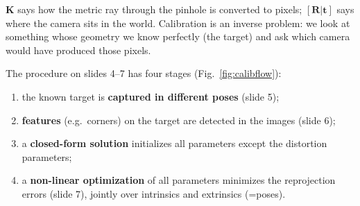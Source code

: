 \documentclass[11pt,a4paper]{article}
\begin{document}
\begin{intuition}
$\bm K$ says how the metric ray through the pinhole is converted to pixels; $[\bm R|\bm t]$ says where the
camera sits in the world. Calibration is an inverse problem: we look at something whose geometry we
know perfectly (the target) and ask which camera would have produced those pixels.
\end{intuition}

The procedure on slides 4--7 has four stages (Fig.~\ref{fig:calibflow}):
\begin{enumerate}
\item the known target is \textbf{captured in different poses} (slide 5);
\item \textbf{features} (e.g.\ corners) on the target are detected in the images (slide 6);
\item a \textbf{closed-form solution} initializes all parameters except the distortion parameters;
\item a \textbf{non-linear optimization} of all parameters minimizes the reprojection errors
 (slide 7), jointly over intrinsics and extrinsics (=poses).
\end{enumerate}
\end{document}

